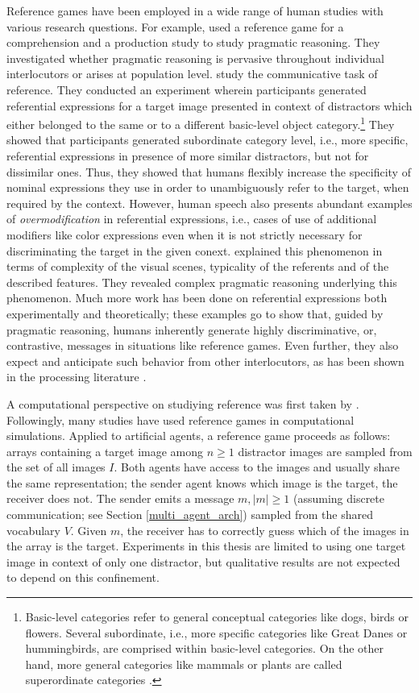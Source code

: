  Reference games have been employed in a wide range of human studies with various research questions. For example, \cite{franke2016reasoning} used a reference game for a comprehension and a production study to study pragmatic reasoning. They investigated whether pragmatic reasoning is pervasive throughout individual interlocutors or arises at population level. \cite{graf2016animal} study the communicative task of reference. They conducted an experiment wherein participants generated referential expressions for a target image presented in context of distractors which either belonged to the same or to a different basic-level object category.\footnote{Basic-level categories refer to general conceptual categories like dogs, birds or flowers. Several subordinate, i.e., more specific categories like Great Danes or hummingbirds, are comprised within basic-level categories. On the other hand, more general categories like mammals or plants are called superordinate categories \parencite{rosch1976basic}.} They showed that participants generated subordinate category level, i.e., more specific, referential expressions in presence of more similar distractors, but not for dissimilar ones. Thus, they showed that humans flexibly increase the specificity of nominal expressions they use in order to unambiguously refer to the target, when required by the context. However, human speech also presents abundant examples of \textit{overmodification} in referential expressions, i.e., cases of use of additional modifiers like color expressions even when it is not strictly necessary for discriminating the target in the given conext. \cite{degen2020redundancy} explained this phenomenon in terms of complexity of the visual scenes, typicality of the referents and of the described features. They revealed complex pragmatic reasoning underlying this phenomenon. Much more work has been done on referential expressions both experimentally and theoretically; these examples go to show that, guided by pragmatic reasoning, humans inherently generate highly discriminative, or, contrastive, messages in situations like reference games. Even further, they also expect and anticipate such behavior from other interlocutors, as has been shown in the processing literature \parencite[e. g., cf.]{sedivy1999achieving}.

A computational perspective on studiying reference was first taken by \cite{dale1995computational}. Followingly, many studies have used reference games in computational simulations. Applied to artificial agents, a reference game proceeds as follows: arrays containing a target image among $n \geq 1$ distractor images are sampled from the set of all images $I$. Both agents have access to the images and usually share the same representation; the sender agent knows which image is the target, the receiver does not. The sender emits a message $m, |m| \geq 1$ (assuming discrete communication; see Section \ref{multi_agent_arch}) sampled from the shared vocabulary $V$. Given $m$, the receiver has to correctly guess which of the images in the array is the target. Experiments in this thesis are limited to using one target image in context of only one distractor, but qualitative results are not expected to depend on this confinement.

